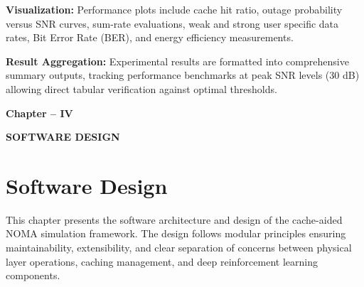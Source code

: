 \documentclass[12pt,a4paper]{article}
\begin{document}
\textbf{Visualization:} Performance plots include cache hit ratio, outage probability versus SNR curves, sum-rate evaluations, weak and strong user specific data rates, Bit Error Rate (BER), and energy efficiency measurements.

\textbf{Result Aggregation:} Experimental results are formatted into comprehensive summary outputs, tracking performance benchmarks at peak SNR levels (30 dB) allowing direct tabular verification against optimal thresholds.

\thispagestyle{plain}


\clearpage

\begin{center}
    \vspace*{10cm}
    
    {\fontsize{16}{19.2}\selectfont\bfseries
    Chapter -- IV}
    
    \vspace{1cm}
    
    {\fontsize{16}{19.2}\selectfont\bfseries
    SOFTWARE DESIGN}
    
    \vspace*{\fill}
\end{center}

\thispagestyle{plain}


\clearpage

\section{Software Design}

This chapter presents the software architecture and design of the cache-aided NOMA simulation framework. The design follows modular principles ensuring maintainability, extensibility, and clear separation of concerns between physical layer operations, caching management, and deep reinforcement learning components.
\end{document}
